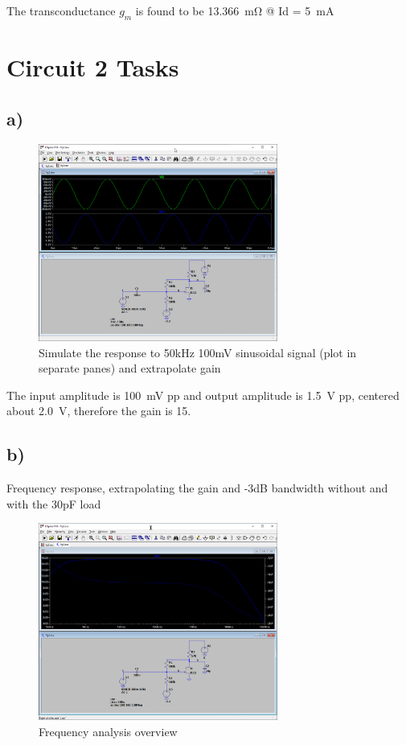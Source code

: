 \documentclass{article}
\begin{document}
	The transconductance $g_m$ is found to be \SI{13.366}{\milli\ohm} @ Id = \SI{5}{\mA}
	
	\section{Circuit 2 Tasks}
	
	\subsection*{a)}

	\begin{figure}[H]
	    \centering
	    \includegraphics[width=0.7\textwidth]{2a}
	    \caption{Simulate the response to 50kHz 100mV sinusoidal signal (plot in separate panes) and extrapolate gain}
	\end{figure}
	
	The input amplitude is \SI{100}{\mV} pp and output amplitude is \SI{1.5}{\volt} pp, centered about \SI{2.0}{\volt}, therefore the gain is 15.
	
	\subsection*{b)}
	
	Frequency response, extrapolating the gain and -3dB bandwidth without and with the 30pF load
	
	\begin{figure}[H]
	    \centering
	    \includegraphics[width=0.7\textwidth]{2a-3}
	    \caption{Frequency analysis overview}
	\end{figure}
	
\end{document}
